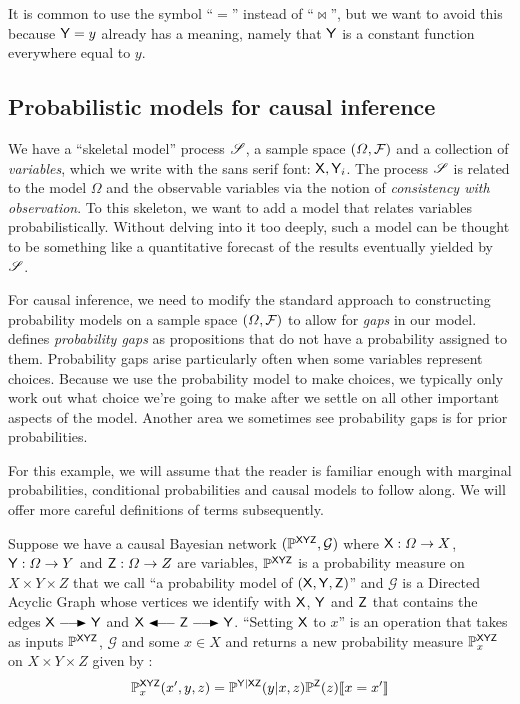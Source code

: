 It is common to use the symbol ``$=$'' instead of ``$\bowtie$'', but we want to avoid this because $\mathsf{Y}=y$ already has a meaning, namely that $\mathsf{Y}$ is a constant function everywhere equal to $y$.

\subsection{Probabilistic models for causal inference}

We have a ``skeletal model'' process $\mathscr{S}$, a sample space $(\Omega,\mathcal{F})$ and a collection of \emph{variables}, which we write with the sans serif font: $\mathsf{X},\mathsf{Y}_i$. The process $\mathscr{S}$ is related to the model $\Omega$ and the observable variables via the notion of \emph{consistency with observation}. To this skeleton, we want to add a model that relates variables probabilistically. Without delving into it too deeply, such a model can be thought to be something like a quantitative forecast of the results eventually yielded by $\mathscr{S}$.

For causal inference, we need to modify the standard approach to constructing probability models on a sample space $(\Omega,\mathcal{F})$ to allow for \emph{gaps} in our model. \citet{hajek_what_2003} defines \emph{probability gaps} as propositions that do not have a probability assigned to them. Probability gaps arise particularly often when some variables represent choices. Because we use the probability model to make choices, we typically only work out what choice we're going to make after we settle on all other important aspects of the model. Another area we sometimes see probability gaps is for prior probabilities.

For this example, we will assume that the reader is familiar enough with marginal probabilities, conditional probabilities and causal models to follow along. We will offer more careful definitions of terms subsequently.

Suppose we have a causal Bayesian network $(\mathbb{P}^{\mathsf{XYZ}},\mathcal{G})$ where $\mathsf{X}:\Omega\to X$, $\mathsf{Y}:\Omega\to Y$ and $\mathsf{Z}:\Omega\to Z$ are variables, $\mathbb{P}^{\mathsf{XYZ}}$ is a probability measure on $X\times Y\times Z$ that we call ``a probability model of $(\mathsf{X},\mathsf{Y},\mathsf{Z})$'' and $\mathcal{G}$ is a Directed Acyclic Graph whose vertices we identify with $\mathsf{X}$, $\mathsf{Y}$ and $\mathsf{Z}$ that contains the edges $\RV{X}\longrightarrowRHD \RV{Y}$ and $\RV{X}\longleftarrowRHD \RV{Z} \longrightarrowRHD \RV{Y}$. ``Setting $\mathsf{X}$ to $x$'' is an operation that takes as inputs $\mathbb{P}^{\mathsf{XYZ}}$, $\mathcal{G}$ and some $x\in X$ and returns a new probability measure $\mathbb{P}_x^{\mathsf{XYZ}}$ on $X\times Y\times Z$ given by \citep[page ~24]{pearl_causality:_2009}:
\begin{align}
	\mathbb{P}^{\mathsf{XYZ}}_{x}(x',y,z)=\mathbb{P}^{\mathsf{Y|XZ}}(y|x,z)\mathbb{P}^{\mathsf{Z}}(z)\llbracket x=x' \rrbracket\label{eq:truncated_fac}
\end{align}


